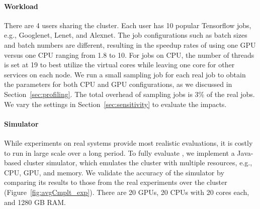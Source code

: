 \paragraph{Workload} There are 4 users sharing the cluster. Each user has 10 popular Tensorflow jobs, e.g., Googlenet, Lenet, and Alexnet. The job configurations such as batch sizes and batch numbers are different, resulting in the speedup rates of using one GPU versus one CPU ranging from 1.8 to 10. 
For jobs on CPU, the number of threads is set at 19 to best utilize the virtual cores while leaving one core for other services on each node. 
We run a small sampling job for each real job to obtain the parameters for both CPU and GPU configurations, as we discussed in Section~\ref{sec:profiling}. 
The total overhead of sampling jobs is 3\% of the real jobs. We vary the settings in Section~\ref{sec:sensitivity} to evaluate the impacts. 

\paragraph{Simulator} While experiments on real systems provide most realistic evaluations, it is costly to run in large scale over a long period. To fully evaluate \name, we implement a Java-based cluster simulator, which emulates the cluster with multiple resources, e.g., CPU, GPU, and memory. We validate the accuracy of the simulator by comparing its results to those from the real experiments over the cluster (Figure~\ref{fig:avgCmplt_exp}). 
There are 20 GPUs, 20 CPUs with 20 cores each, and 1280 GB RAM. %

